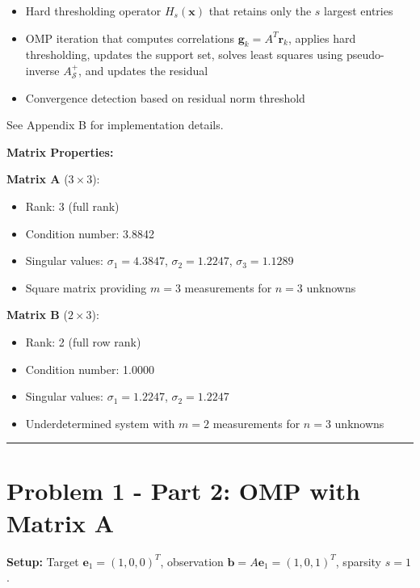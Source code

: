 \begin{itemize}
    \item Hard thresholding operator $H_s(\mathbf{x})$ that retains only the $s$ largest entries
    \item OMP iteration that computes correlations $\mathbf{g}_k = A^T \mathbf{r}_k$, applies hard thresholding, updates the support set, solves least squares using pseudo-inverse $A_\mathcal{S}^+$, and updates the residual
    \item Convergence detection based on residual norm threshold
\end{itemize}

See Appendix B for implementation details.

\vspace{1em}

\textbf{Matrix Properties:}

\textbf{Matrix A} ($3 \times 3$):
\begin{itemize}
    \item Rank: 3 (full rank)
    \item Condition number: 3.8842
    \item Singular values: $\sigma_1 = 4.3847$, $\sigma_2 = 1.2247$, $\sigma_3 = 1.1289$
    \item Square matrix providing $m=3$ measurements for $n=3$ unknowns
\end{itemize}

\textbf{Matrix B} ($2 \times 3$):
\begin{itemize}
    \item Rank: 2 (full row rank)
    \item Condition number: 1.0000
    \item Singular values: $\sigma_1 = 1.2247$, $\sigma_2 = 1.2247$
    \item Underdetermined system with $m=2$ measurements for $n=3$ unknowns
\end{itemize}

\vspace{2em}
\noindent\rule{\textwidth}{0.4pt}

\clearpage
\section*{Problem 1 - Part 2: OMP with Matrix A}

\textbf{Setup:} Target $\mathbf{e}_1 = (1, 0, 0)^T$, observation $\mathbf{b} = A\mathbf{e}_1 = (1, 0, 1)^T$, sparsity $s=1$.

